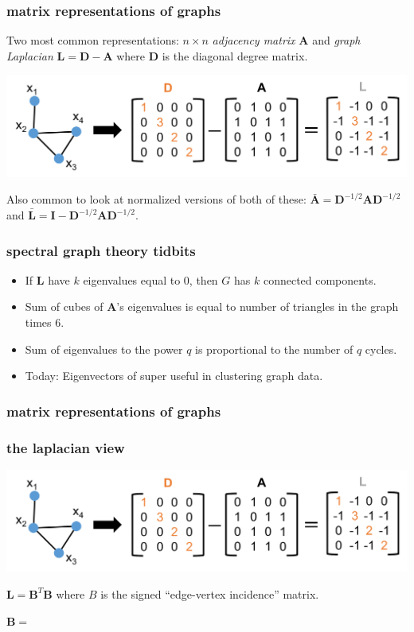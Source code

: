 \documentclass[compress]{beamer}
\newcommand{\bv}[1]{\mathbf{#1}}
\begin{document}
\begin{frame}
	\frametitle{matrix representations of graphs}
	Two most common representations: $n\times n$ \emph{adjacency matrix} $\bv{A}$ and \emph{graph Laplacian} $\bv{L} = \bv{D}- \bv{A}$ where $\bv{D}$ is the diagonal degree matrix.
	\begin{center}
		\includegraphics[width=\textwidth]{laplace.png}
	\end{center}

	Also common to look at normalized versions of both of these: $\bar{\bv{A}} = \bv{D}^{-1/2}\bv{A}\bv{D}^{-1/2}$ and $\bar{\bv{L}} = \bv{I} - \bv{D}^{-1/2}\bv{A}\bv{D}^{-1/2}$. 
\end{frame}

\begin{frame}
	\frametitle{spectral graph theory tidbits}
	\begin{itemize}
		\item If $\bv{L}$ have $k$ eigenvalues equal to $0$, then $G$ has $k$ connected components. 
		\item Sum of cubes of $\bv{A}$'s eigenvalues is equal to number of triangles in the graph times $6$. 
		\item Sum of eigenvalues to the power $q$ is proportional to the number of $q$ cycles. 
		\item \alert{Today: Eigenvectors of super useful in clustering graph data.}
	\end{itemize}
\end{frame}


\begin{frame}[t]
	\frametitle{matrix representations of graphs}
		\frametitle{the laplacian view}
		\begin{center}
			\includegraphics[width=.95\textwidth]{laplace.png}
			
			$\bv{L} = \bv{B}^T\bv{B}$ where $B$ is the signed ``edge-vertex incidence'' matrix.
		\end{center}
		$\bv{B} = $	
\end{frame}
\end{document}
